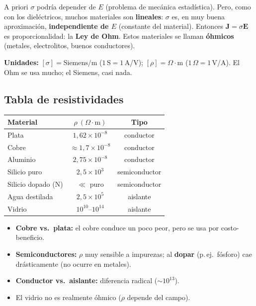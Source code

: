 \documentclass[12pt,a4paper]{article}
\begin{document}
A priori $\sigma$ podría depender de $E$ (problema de mecánica
estadística). Pero, como con los dieléctricos, muchos materiales son
\textbf{lineales}: $\sigma$ es, en muy buena aproximación,
\textbf{independiente de $E$} (constante del material). Entonces
$\mathbf{J}=\sigma\mathbf{E}$ es proporcionalidad: la \textbf{Ley de
Ohm}. Estos materiales se llaman \textbf{óhmicos} (metales, electrolitos,
buenos conductores).

\textbf{Unidades:} $[\sigma]=\text{Siemens/m}$ ($1\,\text{S}=1\,$A/V);
$[\rho]=\Omega\cdot\text{m}$ ($1\,\Omega=1\,$V/A). El Ohm se usa mucho; el
Siemens, casi nada.

\subsection{Tabla de resistividades}

\begin{center}
\begin{tabular}{lcc}
\toprule
\textbf{Material} & $\rho\ (\Omega\cdot\text{m})$ & \textbf{Tipo} \\
\midrule
Plata & $1{,}62\times10^{-8}$ & conductor \\
Cobre & $\approx 1{,}7\times10^{-8}$ & conductor \\
Aluminio & $2{,}75\times10^{-8}$ & conductor \\
Silicio puro & $2{,}5\times10^{3}$ & semiconductor \\
Silicio dopado (N) & $\ll$ puro & semiconductor \\
Agua destilada & $2{,}5\times10^{5}$ & aislante \\
Vidrio & $10^{10}$--$10^{14}$ & aislante \\
\bottomrule
\end{tabular}
\end{center}

\begin{itemize}[nosep]
  \item \textbf{Cobre vs.\ plata:} el cobre conduce un poco peor, pero se
        usa por costo-beneficio.
  \item \textbf{Semiconductores:} $\rho$ muy sensible a impurezas; al
        \textbf{dopar} (p.\,ej.\ fósforo) cae drásticamente (no ocurre en
        metales).
  \item \textbf{Conductor vs.\ aislante:} diferencia radical ($\sim
        10^{13}$).
  \item El vidrio no es realmente óhmico ($\rho$ depende del campo).
\end{itemize}
\end{document}
